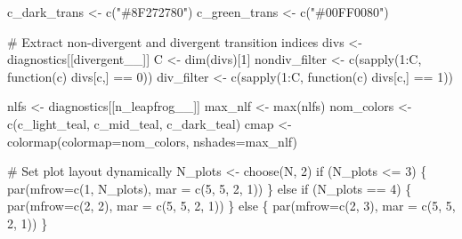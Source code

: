 \documentclass[
  letterpaper,
  DIV=11,
  numbers=noendperiod]{scrartcl}
\newenvironment{Shaded}{\begin{snugshade}}{\end{snugshade}}
\newcommand{\AttributeTok}[1]{\textcolor[rgb]{0.40,0.45,0.13}{#1}}
\newcommand{\CommentTok}[1]{\textcolor[rgb]{0.37,0.37,0.37}{#1}}
\newcommand{\ControlFlowTok}[1]{\textcolor[rgb]{0.00,0.23,0.31}{#1}}
\newcommand{\DecValTok}[1]{\textcolor[rgb]{0.68,0.00,0.00}{#1}}
\newcommand{\FunctionTok}[1]{\textcolor[rgb]{0.28,0.35,0.67}{#1}}
\newcommand{\NormalTok}[1]{\textcolor[rgb]{0.00,0.23,0.31}{#1}}
\newcommand{\OtherTok}[1]{\textcolor[rgb]{0.00,0.23,0.31}{#1}}
\newcommand{\SpecialCharTok}[1]{\textcolor[rgb]{0.37,0.37,0.37}{#1}}
\newcommand{\StringTok}[1]{\textcolor[rgb]{0.13,0.47,0.30}{#1}}
\begin{document}
\begin{Shaded}
\begin{Highlighting}[]
\NormalTok{  c\_dark\_trans }\OtherTok{\textless{}{-}} \FunctionTok{c}\NormalTok{(}\StringTok{"\#8F272780"}\NormalTok{)}
\NormalTok{  c\_green\_trans }\OtherTok{\textless{}{-}} \FunctionTok{c}\NormalTok{(}\StringTok{"\#00FF0080"}\NormalTok{)}

  \CommentTok{\# Extract non{-}divergent and divergent transition indices}
\NormalTok{  divs }\OtherTok{\textless{}{-}}\NormalTok{ diagnostics[[}\StringTok{\textquotesingle{}divergent\_\_\textquotesingle{}}\NormalTok{]]}
\NormalTok{  C }\OtherTok{\textless{}{-}} \FunctionTok{dim}\NormalTok{(divs)[}\DecValTok{1}\NormalTok{]}
\NormalTok{  nondiv\_filter }\OtherTok{\textless{}{-}} \FunctionTok{c}\NormalTok{(}\FunctionTok{sapply}\NormalTok{(}\DecValTok{1}\SpecialCharTok{:}\NormalTok{C, }\ControlFlowTok{function}\NormalTok{(c) divs[c,] }\SpecialCharTok{==} \DecValTok{0}\NormalTok{))}
\NormalTok{  div\_filter    }\OtherTok{\textless{}{-}} \FunctionTok{c}\NormalTok{(}\FunctionTok{sapply}\NormalTok{(}\DecValTok{1}\SpecialCharTok{:}\NormalTok{C, }\ControlFlowTok{function}\NormalTok{(c) divs[c,] }\SpecialCharTok{==} \DecValTok{1}\NormalTok{))}
  
\NormalTok{  nlfs }\OtherTok{\textless{}{-}}\NormalTok{ diagnostics[[}\StringTok{\textquotesingle{}n\_leapfrog\_\_\textquotesingle{}}\NormalTok{]]}
\NormalTok{  max\_nlf }\OtherTok{\textless{}{-}} \FunctionTok{max}\NormalTok{(nlfs)}
\NormalTok{  nom\_colors }\OtherTok{\textless{}{-}} \FunctionTok{c}\NormalTok{(c\_light\_teal, c\_mid\_teal, c\_dark\_teal)}
\NormalTok{  cmap }\OtherTok{\textless{}{-}} \FunctionTok{colormap}\NormalTok{(}\AttributeTok{colormap=}\NormalTok{nom\_colors, }\AttributeTok{nshades=}\NormalTok{max\_nlf)}
  
  \CommentTok{\# Set plot layout dynamically}
\NormalTok{  N\_plots }\OtherTok{\textless{}{-}} \FunctionTok{choose}\NormalTok{(N, }\DecValTok{2}\NormalTok{)}
  \ControlFlowTok{if}\NormalTok{ (N\_plots }\SpecialCharTok{\textless{}=} \DecValTok{3}\NormalTok{) \{}
    \FunctionTok{par}\NormalTok{(}\AttributeTok{mfrow=}\FunctionTok{c}\NormalTok{(}\DecValTok{1}\NormalTok{, N\_plots), }\AttributeTok{mar =} \FunctionTok{c}\NormalTok{(}\DecValTok{5}\NormalTok{, }\DecValTok{5}\NormalTok{, }\DecValTok{2}\NormalTok{, }\DecValTok{1}\NormalTok{))}
\NormalTok{  \} }\ControlFlowTok{else} \ControlFlowTok{if}\NormalTok{ (N\_plots }\SpecialCharTok{==} \DecValTok{4}\NormalTok{) \{}
    \FunctionTok{par}\NormalTok{(}\AttributeTok{mfrow=}\FunctionTok{c}\NormalTok{(}\DecValTok{2}\NormalTok{, }\DecValTok{2}\NormalTok{), }\AttributeTok{mar =} \FunctionTok{c}\NormalTok{(}\DecValTok{5}\NormalTok{, }\DecValTok{5}\NormalTok{, }\DecValTok{2}\NormalTok{, }\DecValTok{1}\NormalTok{))}
\NormalTok{  \} }\ControlFlowTok{else}\NormalTok{ \{}
    \FunctionTok{par}\NormalTok{(}\AttributeTok{mfrow=}\FunctionTok{c}\NormalTok{(}\DecValTok{2}\NormalTok{, }\DecValTok{3}\NormalTok{), }\AttributeTok{mar =} \FunctionTok{c}\NormalTok{(}\DecValTok{5}\NormalTok{, }\DecValTok{5}\NormalTok{, }\DecValTok{2}\NormalTok{, }\DecValTok{1}\NormalTok{))}
\NormalTok{  \}}
  

\end{Highlighting}
\end{Shaded}
\end{document}
